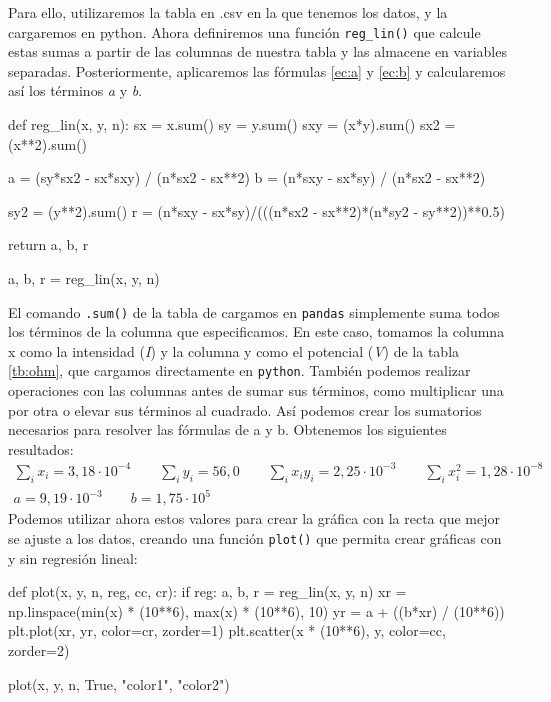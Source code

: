 \documentclass[12pt, a4paper, titlepage]{article}
\newcommand{\code}[1]{\texttt{#1}} %
\begin{document}
  Para ello, utilizaremos la tabla en .csv en la que tenemos los datos, y la cargaremos en python. Ahora definiremos una función \code{reg\_lin()} que calcule estas sumas a partir de las columnas de nuestra tabla y las almacene en variables separadas. Posteriormente, aplicaremos las fórmulas \ref{ec:a} y \ref{ec:b} y calcularemos así los términos \textit{a} y \textit{b}.

  \begin{python}
    def reg_lin(x, y, n):
        sx = x.sum()
        sy = y.sum()
        sxy = (x*y).sum()
        sx2 = (x**2).sum()

        a = (sy*sx2 - sx*sxy) / (n*sx2 - sx**2)
        b = (n*sxy - sx*sy) / (n*sx2 - sx**2)

        sy2 = (y**2).sum()
        r = (n*sxy - sx*sy)/(((n*sx2 - sx**2)*(n*sy2 - sy**2))**0.5)

        return a, b, r

    a, b, r = reg_lin(x, y, n)
  \end{python}

  El comando \code{.sum()} de la tabla de cargamos en \code{pandas} simplemente suma todos los términos de la columna que especificamos. En este caso, tomamos la columna x como la intensidad (\textit{I}) y la columna y como el potencial (\textit{V}) de la tabla \ref{tb:ohm}, que cargamos directamente en \code{python}. También podemos realizar operaciones con las columnas antes de sumar sus términos, como multiplicar una por otra o elevar sus términos al cuadrado. Así podemos crear los sumatorios necesarios para resolver las fórmulas de a y b. Obtenemos los siguientes resultados:
  \begin{gather}
    \sum_i x_i = 3,18\cdot10^{-4} \nonumber \qquad \sum_i y_i = 56,0 \nonumber \qquad \sum_i x_iy_i = 2,25\cdot10^{-3} \nonumber \qquad \sum_i x_i^2 = 1,28\cdot10^{-8} \nonumber \\
    a = 9,19\cdot10^{-3} \nonumber \qquad b = 1,75 \cdot 10^5 \label{v:ohm}
  \end{gather}
  Podemos utilizar ahora estos valores para crear la gráfica con la recta que mejor se ajuste a los datos, creando una función \code{plot()} que permita crear gráficas con y sin regresión lineal:

  \begin{python}
    def plot(x, y, n, reg, cc, cr):
      if reg:
          a, b, r = reg_lin(x, y, n)
          xr = np.linspace(min(x) * (10**6), max(x) * (10**6), 10)
          yr = a + ((b*xr) / (10**6))
          plt.plot(xr, yr, color=cr, zorder=1)
      plt.scatter(x * (10**6), y, color=cc, zorder=2)

    plot(x, y, n, True, "color1", "color2")
  \end{python}
\end{document}
